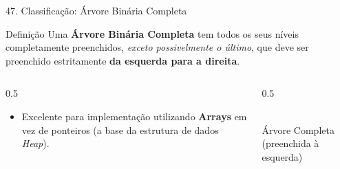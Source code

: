 \documentclass[9pt]{beamer}
\begin{document}
    \begin{frame}{47. Classificação: Árvore Binária Completa}
        \begin{block}{Definição}
            Uma \textbf{Árvore Binária Completa} tem todos os seus níveis completamente preenchidos, \textit{exceto possivelmente o último}, que deve ser preenchido estritamente \textbf{da esquerda para a direita}.
        \end{block}
        \vspace{0.3cm}
        \begin{columns}
            \begin{column}{0.5\textwidth}
                \begin{itemize}
                    \item Excelente para implementação utilizando \textbf{Arrays} em vez de ponteiros (a base da estrutura de dados \textit{Heap}).
                \end{itemize}
            \end{column}
            \begin{column}{0.5\textwidth}
                \centering
                \\
                \vspace{0.2cm}
                \tiny Árvore Completa (preenchida à esquerda)
            \end{column}
        \end{columns}
    \end{frame}
\end{document}
